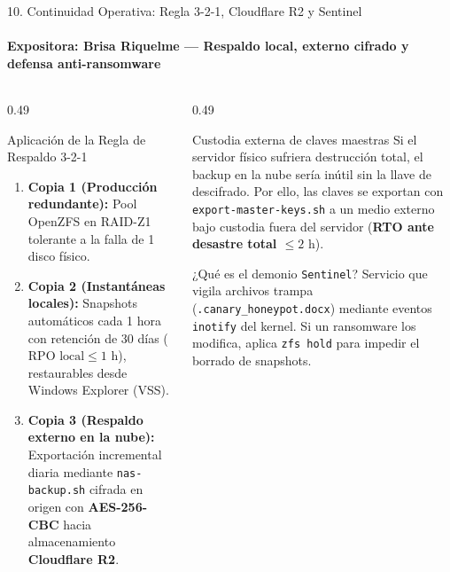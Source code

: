 \documentclass[aspectratio=169,10pt]{beamer}
\begin{document}
\begin{frame}{10. Continuidad Operativa: Regla 3-2-1, Cloudflare R2 y Sentinel}
    \framesubtitle{Expositora: Brisa Riquelme — Respaldo local, externo cifrado y defensa anti-ransomware}
    \begin{columns}[T]
        \begin{column}{0.49\textwidth}
            \begin{block}{Aplicación de la Regla de Respaldo 3-2-1}
                \footnotesize
                \begin{enumerate}
                    \item \textbf{Copia 1 (Producción redundante):} Pool OpenZFS en RAID-Z1 tolerante a la falla de 1 disco físico.
                    \item \textbf{Copia 2 (Instantáneas locales):} Snapshots automáticos cada 1 hora con retención de 30 días ($\text{RPO local} \le 1\text{ h}$), restaurables desde Windows Explorer (VSS).
                    \item \textbf{Copia 3 (Respaldo externo en la nube):} Exportación incremental diaria mediante \texttt{nas-backup.sh} cifrada en origen con \textbf{AES-256-CBC} hacia almacenamiento \textbf{Cloudflare R2}.
                \end{enumerate}
            \end{block}
        \end{column}
        \begin{column}{0.49\textwidth}
            \begin{alertblock}{Custodia externa de claves maestras}
                \footnotesize
                Si el servidor físico sufriera destrucción total, el backup en la nube sería inútil sin la llave de descifrado. Por ello, las claves se exportan con \texttt{export-master-keys.sh} a un medio externo bajo custodia fuera del servidor (\textbf{RTO ante desastre total $\le 2\text{ h}$}).
            \end{alertblock}
            \begin{exampleblock}{¿Qué es el demonio \texttt{Sentinel}?}
                \footnotesize
                Servicio que vigila archivos trampa (\texttt{.canary\_honeypot.docx}) mediante eventos \texttt{inotify} del kernel. Si un ransomware los modifica, aplica \texttt{zfs hold} para impedir el borrado de snapshots.
            \end{exampleblock}
        \end{column}
    \end{columns}
\end{frame}
\end{document}

